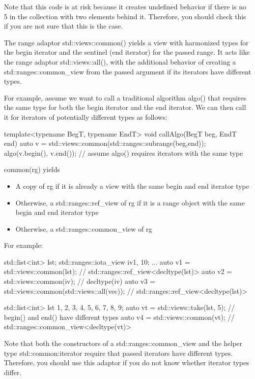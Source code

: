 Note that this code is at risk because it creates undefined behavior if there is no 5 in the collection with two elements behind it. Therefore, you should check this if you are not sure that this is the case.


The range adaptor std::views::common() yields a view with harmonized types for the begin iterator and the sentinel (end iterator) for the passed range. It acts like the range adaptor std::views::all(), with the additional behavior of creating a std::ranges::common\_view from the passed argument if its iterators have different types.

For example, assume we want to call a traditional algorithm algo() that requires the same type for both the begin iterator and the end iterator. We can then call it for iterators of potentially different types as follows:

\begin{cpp}
template<typename BegT, typename EndT>
void callAlgo(BegT beg, EndT end)
{
	auto v = std::views::common(std::ranges::subrange(beg,end));
	algo(v.begin(), v.end()); // assume algo() requires iterators with the same type
}
\end{cpp}

common(rg) yields

\begin{itemize}
\item
A copy of rg if it is already a view with the same begin and end iterator type

\item
Otherwise, a std::ranges::ref\_view of rg if it is a range object with the same begin and end iterator type

\item
Otherwise, a std::ranges::common\_view of rg
\end{itemize}

For example:

\begin{cpp}
std::list<int> lst;
std::ranges::iota_view iv{1, 10};
...
auto v1 = std::views::common(lst); // std::ranges::ref_view<decltype(lst)>
auto v2 = std::views::common(iv); // decltype(iv)
auto v3 = std::views::common(std::views::all(vec));
			// std::ranges::ref_view<decltype(lst)>
			
std::list<int> lst {1, 2, 3, 4, 5, 6, 7, 8, 9};
auto vt = std::views::take(lst, 5); // begin() and end() have different types
auto v4 = std::views::common(vt); // std::ranges::common_view<decltype(vt)>
\end{cpp}

Note that both the constructors of a std::ranges::common\_view and the helper type std::common:iterator require that passed iterators have different types. Therefore, you should use this adaptor if you do not know whether iterator types differ.











